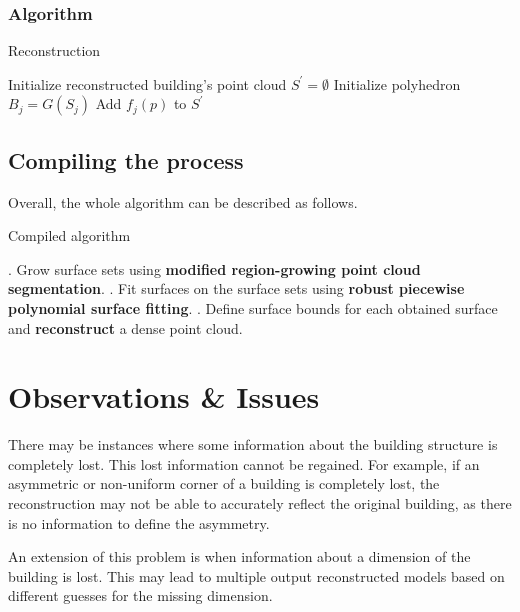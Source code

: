 \documentclass[12pt,a4paper]{article}
\begin{document}
    \subsubsection{Algorithm}
    \begin{algorithm}[H]
        \caption{Reconstruction}
        \begin{algorithmic}
            \State Initialize reconstructed building's point cloud $S^\prime = \emptyset$
            \State Initialize polyhedron $B_j = G(S_j)$
            \State Add  $f_j(p)$ to $S^\prime$
            \EndFor
            \EndFor
        \end{algorithmic}
    \end{algorithm}


    \subsection{Compiling the process}
    
    Overall, the whole algorithm can be described as follows.
    
    \begin{algorithm}[H]
        \caption{Compiled algorithm}
        \begin{algorithmic}
            . Grow surface sets using \textbf{modified region-growing point cloud segmentation}.
            . Fit surfaces on the surface sets using \textbf{robust piecewise polynomial surface fitting}.
            . Define surface bounds for each obtained surface and \textbf{reconstruct} a dense point cloud.
        \end{algorithmic}
    \end{algorithm}
    
    
    \section{Observations \& Issues}\label{issues}
    
    There may be instances where some information about the building structure is completely lost. This lost information cannot be regained. For example, if an asymmetric or non-uniform corner of a building is completely lost, the reconstruction may not be able to accurately reflect the original building, as there is no information to define the asymmetry.
    
    An extension of this problem is when information about a dimension of the building is lost. This may lead to multiple output reconstructed models based on different guesses for the missing dimension.
    
\end{document}
